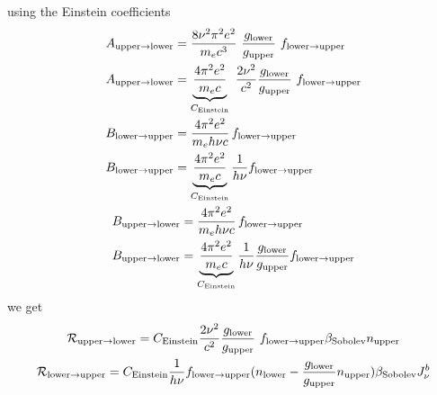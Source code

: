 \documentclass[letterpaper,10pt,english]{sphinxmanual}
\begin{document}
using the Einstein coefficients
\begin{gather}
\begin{split}A_{\textrm{upper}\rightarrow\textrm{lower}} &= \frac{8 \nu^2 \pi^2 e^2}{m_e c^3}~
    \frac{g_\textrm{lower}}{g_\textrm{upper}}~f_{\textrm{lower}\rightarrow\textrm{upper}}\\
A_{\textrm{upper}\rightarrow\textrm{lower}} &= \underbrace{\frac{4 \pi^2 e^2}{m_e c}}_{C_\textrm{Einstein}}~ \frac{2\nu^2}{c^2}
        \frac{g_\textrm{lower}}{g_\textrm{upper}}~f_{\textrm{lower}\rightarrow\textrm{upper}}\\
B_{\textrm{lower}\rightarrow\textrm{upper}} &= \frac{4\pi^2 e^2}{m_e h\nu c}\,f_{\textrm{lower}\rightarrow\textrm{upper}}\\
B_{\textrm{lower}\rightarrow\textrm{upper}} &= \underbrace{\frac{4 \pi^2 e^2}{m_e c}}_{C_\textrm{Einstein}}\frac{1}{h\nu} f_{\textrm{lower}\rightarrow\textrm{upper}}\\\end{split}\notag\\\begin{split}B_{\textrm{upper}\rightarrow\textrm{lower}} &= \frac{4\pi^2 e^2}{m_e h\nu c}\,f_{\textrm{lower}\rightarrow\textrm{upper}}\\
B_{\textrm{upper}\rightarrow\textrm{lower}} &= \underbrace{\frac{4 \pi^2 e^2}{m_e c}}_{C_\textrm{Einstein}}\frac{1}{h\nu}\frac{g_\textrm{lower}}{g_\textrm{upper}}f_{\textrm{lower}\rightarrow\textrm{upper}}\\\end{split}\notag
\end{gather}
we get
\begin{gather}
\begin{split}{\cal R}_{\textrm{upper}\rightarrow\textrm{lower}} &=
    C_\textrm{Einstein} \frac{2\nu^2}{c^2} \frac{g_\textrm{lower}}{g_\textrm{upper}}~f_{\textrm{lower}\rightarrow\textrm{upper}}
    \beta_\textrm{Sobolev}n_\textrm{upper}\\\end{split}\notag\\\begin{split}{\cal R}_{\textrm{lower}\rightarrow\textrm{upper}} &=
        C_\textrm{Einstein}\frac{1}{h\nu} f_{\textrm{lower}\rightarrow\textrm{upper}}
        (n_\textrm{lower}-\frac{g_\textrm{lower}}{g_\textrm{upper}}n_\textrm{upper})
                    \beta_\textrm{Sobolev} J_{\nu}^{b}\\\end{split}\notag
\end{gather}
\end{document}
